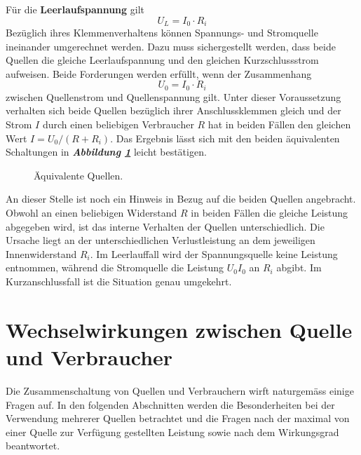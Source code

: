 \newline\newline
Für die \textbf{Leerlaufspannung} gilt
\begin{equation}
\boxed{U_L=I_0\cdot R_i}
\end{equation}
Bezüglich ihres Klemmenverhaltens können Spannungs- und Stromquelle ineinander umgerechnet werden. Dazu muss sichergestellt werden, dass beide Quellen die gleiche Leerlaufspannung und den gleichen Kurzschlussstrom aufweisen. Beide Forderungen werden erfüllt, wenn der Zusammenhang
\begin{equation}
\boxed{U_0=I_0\cdot R_i}
\end{equation}
zwischen Quellenstrom und Quellenspannung gilt. Unter dieser Voraussetzung verhalten sich beide Quellen bezüglich ihrer Anschlussklemmen gleich und der Strom $I$ durch einen beliebigen Verbraucher $R$ hat in beiden Fällen den gleichen Wert $I=U_0/\left(R+R_i\right)$. Das Ergebnis lässt sich mit den beiden äquivalenten Schaltungen in \textbf{\textit{Abbildung \ref{fig_IIIx}}} leicht bestätigen.
\begin{figure}[H]
\centering
\caption{Äquivalente Quellen.}
\label{fig_IIIx}
\end{figure}
\noindent An dieser Stelle ist noch ein Hinweis in Bezug auf die beiden Quellen angebracht. Obwohl an einen beliebigen Widerstand $R$ in beiden Fällen die gleiche Leistung abgegeben wird, ist das interne Verhalten der Quellen unterschiedlich. Die Ursache liegt an der unterschiedlichen Verlustleistung an dem jeweiligen Innenwiderstand $R_i$. Im Leerlauffall wird der Spannungsquelle keine Leistung entnommen, während die Stromquelle die Leistung $U_0I_0$ an $R_i$ abgibt. Im Kurzanschlussfall ist die Situation genau umgekehrt.
\section{Wechselwirkungen zwischen Quelle und Verbraucher}
Die Zusammenschaltung von Quellen und Verbrauchern wirft naturgemäss einige Fragen auf. In den folgenden Abschnitten werden die Besonderheiten bei der Verwendung mehrerer Quellen betrachtet und die Fragen nach der maximal von einer Quelle zur Verfügung gestellten Leistung sowie nach dem Wirkungsgrad beantwortet.
